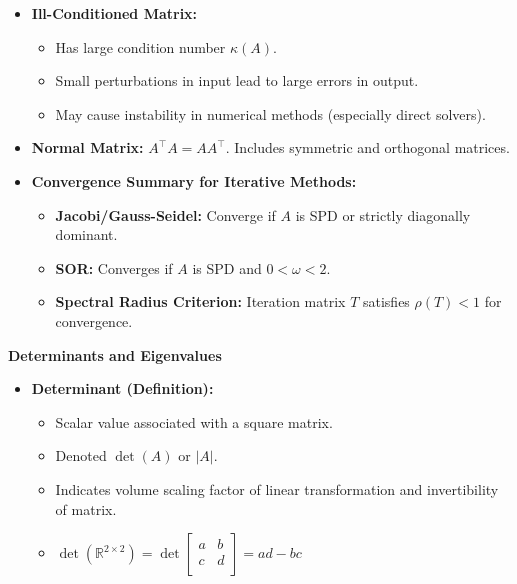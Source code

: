 \documentclass[9pt,letterpaper]{article}
\begin{document}
\begin{multicols*}{3}
\begin{itemize}
    \item \textbf{Ill-Conditioned Matrix:}
      \begin{itemize}
        \item Has large condition number $\kappa(A)$.
        \item Small perturbations in input lead to large errors in output.
        \item May cause instability in numerical methods (especially direct solvers).
      \end{itemize}

    \item \textbf{Normal Matrix:} $A^\top A = AA^\top$. Includes symmetric and orthogonal matrices.

    \item \textbf{Convergence Summary for Iterative Methods:}
      \begin{itemize}
        \item \textbf{Jacobi/Gauss-Seidel:} Converge if $A$ is SPD or strictly diagonally dominant.
        \item \textbf{SOR:} Converges if $A$ is SPD and $0 < \omega < 2$.
        \item \textbf{Spectral Radius Criterion:} Iteration matrix $T$ satisfies $\rho(T) < 1$ for convergence.
      \end{itemize}
  \end{itemize}

  \noindent
  \textbf{\large Determinants and Eigenvalues}
  \begin{itemize}
    \item \textbf{Determinant (Definition):}
      \begin{itemize}
        \item Scalar value associated with a square matrix.
        \item Denoted $\det(A)$ or $|A|$.
        \item Indicates volume scaling factor of linear transformation and invertibility of matrix.
        \item $\det(\mathbb{R}^{2\times 2}) = \det \begin{bmatrix}
            a & b\\
            c & d\\
          \end{bmatrix} = ad - bc$
      \end{itemize}


\end{itemize}
\end{multicols*}
\end{document}
